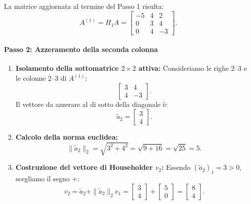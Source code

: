 \begin{example}
\begin{enumerate}
\begin{itemize}
\begin{equation}
        \end{equation}
    \end{itemize}
    La matrice aggiornata al termine del Passo 1 risulta:
    \begin{equation}
        A^{(1)} = H_1 A = \begin{bmatrix} 
        -5 & 4 & 2 \\ 
        0 & 3 & 4 \\ 
        0 & 4 & -3 
        \end{bmatrix}.
    \end{equation}
\end{enumerate}

\paragraph{Passo 2: Azzeramento della seconda colonna}
\begin{enumerate}
    \item \textbf{Isolamento della sottomatrice $2 \times 2$ attiva:}
    Consideriamo le righe 2--3 e le colonne 2--3 di $A^{(1)}$:
    \begin{equation}
        \begin{bmatrix} 3 & 4 \\ 4 & -3 \end{bmatrix}.
    \end{equation}
    Il vettore da azzerare al di sotto della diagonale \`e:
    \begin{equation}
        \tilde{a}_2 = \begin{bmatrix} 3 \\ 4 \end{bmatrix}.
    \end{equation}
    \item \textbf{Calcolo della norma euclidea:}
    \begin{equation}
        \|\tilde{a}_2\|_2 = \sqrt{3^2 + 4^2} = \sqrt{9 + 16} = \sqrt{25} = 5.
    \end{equation}
    \item \textbf{Costruzione del vettore di Householder $v_2$:}
    Essendo $(\tilde{a}_2)_1 = 3 > 0$, scegliamo il segno $+$:
    \begin{equation}
        v_2 = \tilde{a}_2 + \|\tilde{a}_2\|_2 e_1 = \begin{bmatrix} 3 \\ 4 \end{bmatrix} + \begin{bmatrix} 5 \\ 0 \end{bmatrix} = \begin{bmatrix} 8 \\ 4 \end{bmatrix}.

\end{equation}
\end{enumerate}
\end{example}
